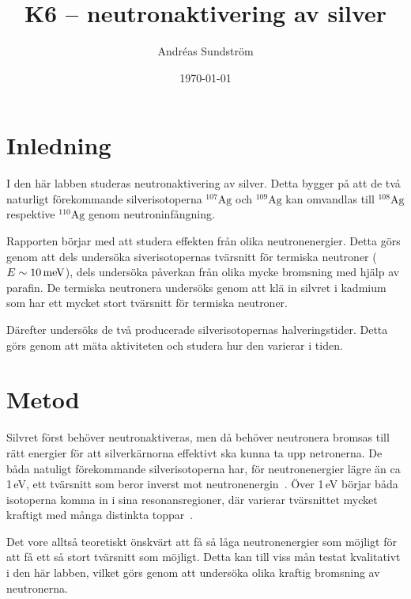 \documentclass[11pt,a4paper, english, swedish
]{article}
\begin{document}

\title{K6 -- neutronaktivering av silver}
\author{Andréas Sundström}
\date{\today}

\maketitle



\section{Inledning}
I den här labben studeras neutronaktivering av silver. Detta bygger på att de två naturligt förekommande silverisotoperna $^{107}\text{Ag}$ och $^{109}\text{Ag}$ kan omvandlas till $^{108}\text{Ag}$ respektive $^{110}\text{Ag}$ genom neutroninfångning.

Rapporten börjar med att studera effekten från olika neutronenergier. Detta görs genom att dels undersöka siverisotopernas tvärsnitt för termiska neutroner ($E\sim \unit[10]{meV}$), dels undersöka påverkan från olika mycke bromsning med hjälp av parafin. De termiska neutronera undersöks genom att klä in silvret i kadmium som har ett mycket stort tvärsnitt för termiska neutroner. 

Därefter undersöks de två producerade silverisotopernas halveringstider. Detta görs genom att mäta aktiviteten och studera hur den varierar i tiden.

\section{Metod}
Silvret först behöver neutronaktiveras, men då behöver neutronera bromsas till rätt energier för att silverkärnorna effektivt ska kunna ta upp netronerna. De båda natuligt förekommande silverisotoperna har, för neutronenergier lägre än ca 1\,eV, ett tvärsnitt som beror inverst mot neutronenergin~\cite{labPM}. Över 1\,eV börjar båda isotoperna komma in i sina resonansregioner, där varierar tvärsnittet mycket kraftigt med många distinkta toppar~\cite{labPM}. 

Det vore alltså teoretiskt önskvärt att få så låga neutronenergier som möjligt för att få ett så stort tvärsnitt som möjligt. Detta kan till viss mån testat kvalitativt i den här labben, vilket görs genom att undersöka olika kraftig bromsning av neutronerna. 
\end{document}
